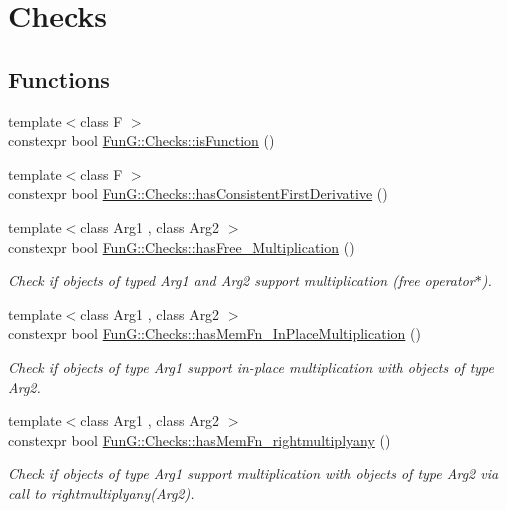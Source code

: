 \hypertarget{group__Checks}{}\section{Checks}
\label{group__Checks}
\subsection*{Functions}
\begin{DoxyCompactItemize}
\item 
{\footnotesize template$<$class F $>$ }\\constexpr bool \hyperlink{group__Checks_gac6e6c5574a8497cc0749e5a613e4d57c}{Fun\+G\+::\+Checks\+::is\+Function} ()
\item 
{\footnotesize template$<$class F $>$ }\\constexpr bool \hyperlink{group__Checks_ga5f9a3a474205df6f565dd1a03ebb5e28}{Fun\+G\+::\+Checks\+::has\+Consistent\+First\+Derivative} ()
\item 
{\footnotesize template$<$class Arg1 , class Arg2 $>$ }\\constexpr bool \hyperlink{group__Checks_ga81302dfb773e50401ec899c3b9a53c4c}{Fun\+G\+::\+Checks\+::has\+Free\+\_\+\+Multiplication} ()
\begin{DoxyCompactList}\small\item\em Check if objects of typed Arg1 and Arg2 support multiplication (free operator$\ast$). \end{DoxyCompactList}\item 
{\footnotesize template$<$class Arg1 , class Arg2 $>$ }\\constexpr bool \hyperlink{group__Checks_ga1fb52331af88ccf29e380c8e5597e801}{Fun\+G\+::\+Checks\+::has\+Mem\+Fn\+\_\+\+In\+Place\+Multiplication} ()
\begin{DoxyCompactList}\small\item\em Check if objects of type Arg1 support in-\/place multiplication with objects of type Arg2. \end{DoxyCompactList}\item 
{\footnotesize template$<$class Arg1 , class Arg2 $>$ }\\constexpr bool \hyperlink{group__Checks_ga88d1f93f87cf5f51d426fcfee862d6f6}{Fun\+G\+::\+Checks\+::has\+Mem\+Fn\+\_\+rightmultiplyany} ()
\begin{DoxyCompactList}\small\item\em Check if objects of type Arg1 support multiplication with objects of type Arg2 via call to rightmultiplyany(\+Arg2). \end{DoxyCompactList}\item 

\end{DoxyCompactItemize}

